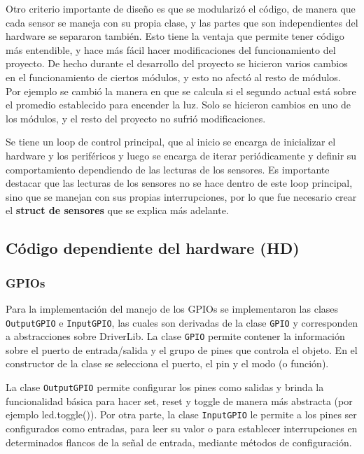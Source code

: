 Otro criterio importante de diseño es que se modularizó el código, de manera que cada sensor se
maneja con su propia clase, y las partes que son independientes del hardware se separaron
también. Esto tiene la ventaja que permite tener código más entendible, y hace más fácil hacer
modificaciones del funcionamiento del proyecto. De hecho durante el desarrollo del proyecto se
hicieron varios cambios en el funcionamiento de ciertos módulos, y esto no afectó al resto de
módulos. Por ejemplo se cambió la manera en que se calcula si el segundo actual está sobre el
promedio establecido para encender la luz. Solo se hicieron cambios en uno de los módulos, y el
resto del proyecto no sufrió modificaciones.

Se tiene un loop de control principal, que al inicio se encarga de inicializar el hardware y los
periféricos y luego se encarga de iterar periódicamente y definir su comportamiento dependiendo de
las lecturas de los sensores. Es importante destacar que las lecturas de los sensores no se hace
dentro de este loop principal, sino que se manejan con sus propias interrupciones, por lo que fue
necesario crear el \textbf{struct de sensores} que se explica más adelante. 


\subsection{Código dependiente del hardware (HD)}

\subsubsection{GPIOs}
Para la implementación del manejo de los GPIOs se implementaron las clases \texttt{OutputGPIO} e
\texttt{InputGPIO}, las cuales son derivadas de la clase \texttt{GPIO} y corresponden a
abstracciones sobre DriverLib. La clase \texttt{GPIO} permite contener la información sobre el
puerto de entrada/salida y el grupo de pines que controla el objeto. En el constructor de la clase
se selecciona el puerto, el pin y el modo (o función). 

La clase \texttt{OutputGPIO} permite configurar los pines como salidas y brinda la
funcionalidad básica para hacer set, reset y toggle de manera más abstracta (por ejemplo
led.toggle()). Por otra parte, la clase \texttt{InputGPIO} le permite a los pines ser configurados
como entradas, para leer su valor o para establecer interrupciones en determinados flancos de la
señal de entrada, mediante métodos de configuración.



